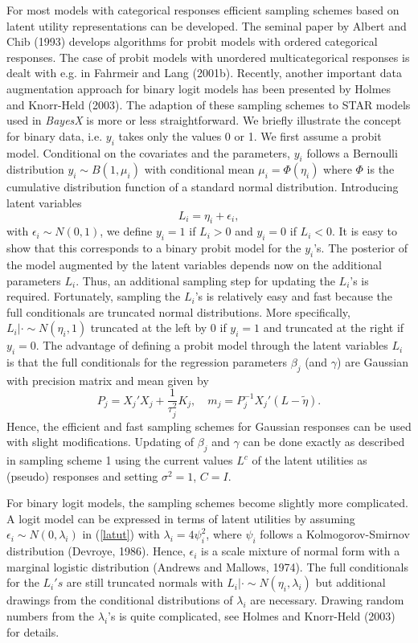 For most models with categorical responses efficient sampling
schemes based on latent utility representations can be developed.
The seminal paper by Albert and Chib (1993) develops algorithms
for probit models  with  ordered categorical responses. The case
of probit models with unordered multicategorical responses is
dealt with e.g. in Fahrmeir and Lang (2001b). Recently, another
important data augmentation approach for binary logit models has
been presented by Holmes and Knorr-Held (2003). The adaption of
these sampling schemes to STAR models used in {\em BayesX} is more
or less straightforward. We briefly illustrate the concept for
binary data, i.e. $y_i$ takes only the values 0 or 1. We first
assume a probit model. Conditional on the covariates and the
parameters, $y_i$ follows a Bernoulli distribution $y_i \sim
B(1,\mu_i)$ with conditional mean $\mu_i = \Phi(\eta_i)$ where
$\Phi$ is the cumulative distribution function of a standard
normal distribution. Introducing latent variables
\begin{equation}
\label{latut} L_i = \eta_i + \epsilon_i,
\end{equation}
with $\epsilon_i \sim N(0,1)$, we define $y_i = 1$ if $L_i > 0$
and $y_i=0$ if $L_i < 0$. It is easy to show that this corresponds
to a binary probit model for the $y_i$'s. The posterior of the
model augmented by the latent variables depends now on the
additional parameters $L_i$. Thus, an additional sampling step for
updating the $L_i$'s is required. Fortunately, sampling the
$L_i$'s is relatively easy and fast because the full conditionals
are truncated normal distributions. More specifically, $L_i |
\cdot \sim N(\eta_i,1)$ truncated at the left by 0 if $y_i=1$ and
truncated at the right if $y_i=0$. The advantage of defining a
probit model through the latent variables $L_i$ is that the full
conditionals for the regression parameters $\beta_j$ (and
$\gamma$) are Gaussian with precision matrix and mean given by
\begin{equation}
\label{prec2} P_j = X_j'X_j + \frac{1}{\tau^2_j}K_j, \quad m_j =
P_j^{-1}X_j'(L-\tilde{\eta}).
\end{equation}
Hence, the efficient and fast sampling schemes for Gaussian
responses can be used with slight modifications. Updating of
$\beta_j$ and $\gamma$ can be done exactly as described in
sampling scheme 1  using the current values $L^c$ of the latent
utilities as (pseudo) responses and setting $\sigma^2=1$, $C=I$.

For binary logit models, the sampling schemes become slightly more
complicated. A logit model can be expressed in terms of latent
utilities by assuming $\epsilon_i \sim N(0,\lambda_i)$ in
(\ref{latut}) with $\lambda_i = 4\psi_i^2$, where $\psi_i$ follows
a Kolmogorov-Smirnov distribution (Devroye, 1986). Hence,
$\epsilon_i$ is  a scale mixture of normal form with a marginal
logistic distribution (Andrews and Mallows, 1974). The full
conditionals for the $L_i's$ are still truncated normals with $L_i
| \cdot \sim N(\eta_i,\lambda_i)$ but additional drawings from the
conditional distributions of $\lambda_i$ are necessary. Drawing
random numbers from the $\lambda_i$'s is quite complicated, see
Holmes and Knorr-Held (2003) for details.

